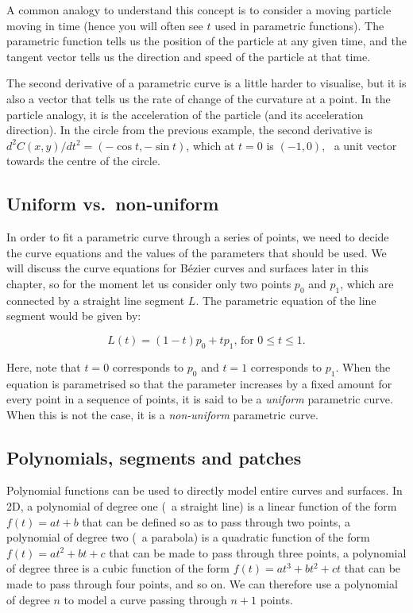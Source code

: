 A common analogy to understand this concept is to consider a moving particle moving in time (hence you will often see \(t\) used in parametric functions).
The parametric function tells us the position of the particle at any given time, and the tangent vector tells us the direction and speed of the particle at that time.

The second derivative of a parametric curve is a little harder to visualise, but it is also a vector that tells us the rate of change of the curvature at a point.
In the particle analogy, it is the acceleration of the particle (and its acceleration direction).
In the circle from the previous example, the second derivative is \(d^2C(x,y)/dt^2 = (-\cos t, -\sin t)\), which at \(t=0\) is \((-1, 0)\), \ie\ a unit vector towards the centre of the circle.

\subsection{Uniform vs.\ non-uniform}

In order to fit a parametric curve through a series of points, we need to decide the curve equations and the values of the parameters that should be used.
We will discuss the curve equations for B\'ezier curves and surfaces later in this chapter, so for the moment let us consider only two points \(p_0\) and \(p_1\), which are connected by a straight line segment \(L\).
The parametric equation of the line segment would be given by:

\begin{equation}
\label{eq:lineparam}
L(t) = (1-t)p_0 + tp_1\text{, for }0 \leq t \leq 1.
\end{equation}

Here, note that \(t=0\) corresponds to \(p_0\) and \(t=1\) corresponds to \(p_1\).
When the equation is parametrised so that the parameter increases by a fixed amount for every point in a sequence of points, it is said to be a \emph{uniform} parametric curve.
When this is not the case, it is a \emph{non-uniform} parametric curve.

\subsection{Polynomials, segments and patches}

Polynomial functions can be used to directly model entire curves and surfaces.
In 2D, a polynomial of degree one (\ie\ a straight line) is a linear function of the form \(f(t) = at+b\) that can be defined so as to pass through two points, a polynomial of degree two (\ie\ a parabola) is a quadratic function of the form \(f(t)=at^2+bt+c\) that can be made to pass through three points, a polynomial of degree three is a cubic function of the form \(f(t)=at^3+bt^2+ct\) that can be made to pass through four points, and so on.
We can therefore use a polynomial of degree \(n\) to model a curve passing through \(n+1\) points.

